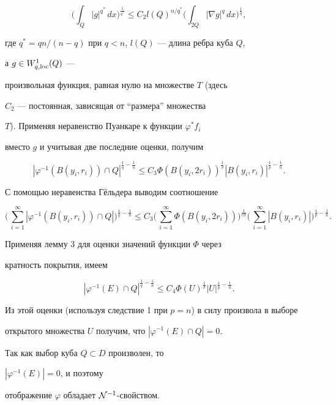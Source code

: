 \begin{pf}
$$


\bigg(\int_{Q}|g|^{q^*}\,dx\bigg)^{\frac{1}{{q^*}}}\leq


C_2l(Q)^{n/{q^*}} \bigg(\int_{2Q}|\nabla


g|^q\,dx\bigg)^{\frac{1}{q}},


$$


где ${q^*}=qn/(n-q)$ при $q<n$, $l(Q)$ --- длина ребра куба $Q$,


а $g\in W^1_{q,\operatorname{loc}}(Q)$ ---


произвольная функция, равная нулю на множестве $T$ (здесь


$C_2$ --- постоянная, зависящая от ``размера'' множества


$T$). Применяя неравенство Пуанкаре к функции $\varphi^{\ast}f_i$


вместо $g$ и учитывая две последние оценки, получим


$$


|\varphi^{-1}(B(y_i,r_i))\cap Q|^{\frac{1}{q} - \frac{1}{n}}\leq


C_3\Phi(B(y_i,2r_i))^{\frac{1}{\sigma}}


|B(y_i,r_i)|^{\frac{1}{p} - \frac{1}{n}}.


$$


С помощью неравенства Г\"ельдера выводим соотношение


$$


\bigg(\,


\sum_{i=1}^{\infty}|\varphi^{-1}(B(y_i,r_i))\cap Q|


\bigg)^{\frac{1}{q} - \frac{1}{n}}


\leq C_3\bigg(\,\sum_{i=1}^{\infty}\Phi(B(y_i,2r_i))


\bigg)^{\frac{1}{r \sigma}}


\bigg(\,\sum_{i=1}^{\infty}|B(y_i,r_i)|


\bigg)^{\frac{1}{p} - \frac{1}{n}}.


$$


Применяя лемму 3 для оценки значений функции $\Phi$ через


кратность покрытия, имеем


$$


|\varphi^{-1}(E)\cap Q|^{\frac{1}{q} -\frac{1}{n}}\leq


C_4\Phi(U)^{\frac{1}{\sigma}}


|U|^{\frac{1}{p} - \frac{1}{n}}.


$$


Из этой оценки (используя следствие 1 при $p=n$) в силу произвола в выборе


открытого множества $U$ получим, что $|\varphi^{-1}(E)\cap Q|=0$.


Так как выбор куба $Q\subset D$ произволен, то


$|\varphi^{-1}(E)|=0$, и поэтому


отображение $\varphi$ обладает ${\cal N}^{-1}$-свойством.


\end{pf}





